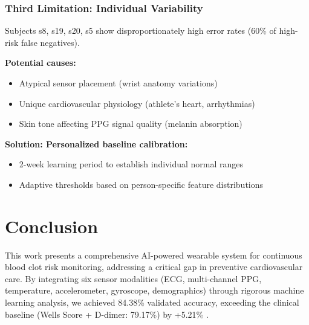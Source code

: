 \documentclass[3p,times,procedia]{elsarticle}
\begin{document}
\subsubsection{Third Limitation: \textbf{Individual Variability}}

Subjects s8, s19, s20, s5 show disproportionately high error rates (60\% of high-risk false negatives).

\textbf{Potential causes:}
\begin{itemize}
    \item Atypical sensor placement (wrist anatomy variations)
    \item Unique cardiovascular physiology (athlete's heart, arrhythmias)
    \item Skin tone affecting PPG signal quality (melanin absorption)
\end{itemize}

\textbf{Solution: Personalized baseline calibration:}
\begin{itemize}
    \item 2-week learning period to establish individual normal ranges
    \item Adaptive thresholds based on person-specific feature distributions
\end{itemize}

\section{Conclusion}
\label{sec:con}
\vspace{-3pt}
This work presents a comprehensive AI-powered wearable system for continuous blood clot risk monitoring, addressing a critical gap in preventive cardiovascular care. By integrating six sensor modalities (ECG, multi-channel PPG, temperature, accelerometer, gyroscope, demographics) through rigorous machine learning analysis, we achieved 84.38\% validated accuracy, exceeding the clinical baseline (Wells Score + D-dimer: 79.17\%) by +5.21\% \cite{wells1997value}.
\end{document}
